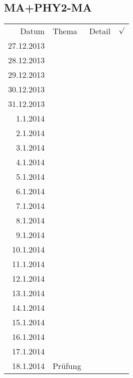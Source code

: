 \subsection{MA+PHY2-MA}
\begin{tabular}{r l p{} l}
\rowcolor{lgray} Datum       & Thema         & Detail & $\surd$ \\
\rowcolor{white}  27.12.2013 &               &  &  \\
\rowcolor{lgray}  28.12.2013 &               &  &  \\
\rowcolor{white}  29.12.2013 &               &  &  \\
\rowcolor{lgray}  30.12.2013 &               &  &  \\
\rowcolor{white}  31.12.2013 &               &  &  \\
\rowcolor{lgray}    1.1.2014 &               &  &  \\
\rowcolor{white}    2.1.2014 &               &  &  \\
\rowcolor{lgray}    3.1.2014 &               &  &  \\
\rowcolor{white}    4.1.2014 &               &  &  \\
\rowcolor{lgray}    5.1.2014 &               &  &  \\
\rowcolor{white}    6.1.2014 &               &  &  \\
\rowcolor{lgray}    7.1.2014 &               &  &  \\
\rowcolor{white}    8.1.2014 &               &  &  \\
\rowcolor{lgray}    9.1.2014 &               &  &  \\
\rowcolor{white}   10.1.2014 &               &  &  \\
\rowcolor{lgray}   11.1.2014 &               &  &  \\
\rowcolor{white}   12.1.2014 &               &  &  \\
\rowcolor{lgray}   13.1.2014 &               &  &  \\
\rowcolor{white}   14.1.2014 &               &  &  \\
\rowcolor{lgray}   15.1.2014 &               &  &  \\
\rowcolor{white}   16.1.2014 &               &  &  \\
\rowcolor{lgray}   17.1.2014 &               &  &  \\
\rowcolor{white}   18.1.2014 & Prüfung       &  &  \\
\end{tabular}

